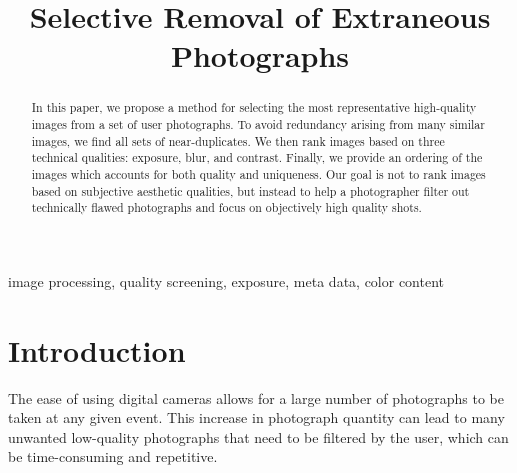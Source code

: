 \documentclass{article}
\begin{document}
\sloppy
\topmargin=0mm			


\title{
Selective Removal of Extraneous Photographs
}

\address{[ksamii,acarlisl]@ucsc.edu,[uliana,davis]@soe.ucsc.edu}

\maketitle	
\begin{abstract}
In this paper, we propose a method for selecting the most representative high-quality images from a set of user photographs. To avoid redundancy arising from many similar images, we find all sets of near-duplicates. We then rank images based on three technical qualities: exposure, blur, and contrast. Finally, we provide an ordering of the images which accounts for both quality and uniqueness. Our goal is not to rank images based on subjective aesthetic qualities, but instead to help a photographer filter out technically flawed photographs and focus on objectively high quality shots.
\end{abstract}	

\begin{keywords}
image processing, quality screening, exposure, meta data, color content  %
\end{keywords}

\section{Introduction}
\label{sec:intro}

The ease of using digital cameras allows for a large number of photographs to be taken at any given event. This increase in photograph quantity can lead to many unwanted low-quality photographs that need to be filtered by the user, which can be time-consuming and repetitive.
\end{document}
